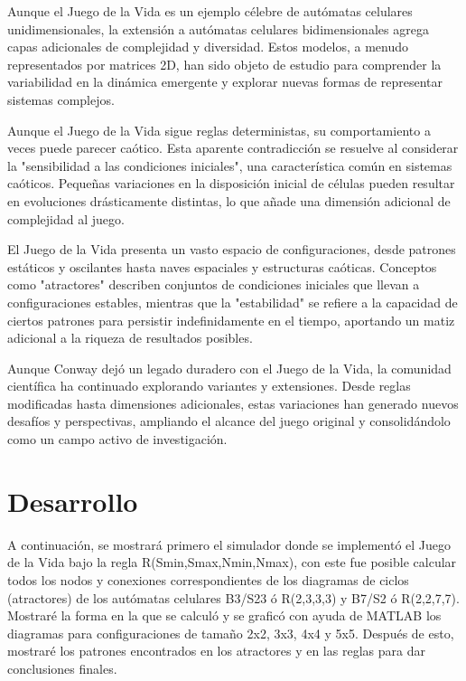 \documentclass{article}
\begin{document}
	Aunque el Juego de la Vida es un ejemplo célebre de autómatas celulares unidimensionales, la extensión a autómatas celulares bidimensionales agrega capas adicionales de complejidad y diversidad. Estos modelos, a menudo representados por matrices 2D, han sido objeto de estudio para comprender la variabilidad en la dinámica emergente y explorar nuevas formas de representar sistemas complejos.
	
	Aunque el Juego de la Vida sigue reglas deterministas, su comportamiento a veces puede parecer caótico. Esta aparente contradicción se resuelve al considerar la "sensibilidad a las condiciones iniciales", una característica común en sistemas caóticos. Pequeñas variaciones en la disposición inicial de células pueden resultar en evoluciones drásticamente distintas, lo que añade una dimensión adicional de complejidad al juego.
	
	El Juego de la Vida presenta un vasto espacio de configuraciones, desde patrones estáticos y oscilantes hasta naves espaciales y estructuras caóticas. Conceptos como "atractores" describen conjuntos de condiciones iniciales que llevan a configuraciones estables, mientras que la "estabilidad" se refiere a la capacidad de ciertos patrones para persistir indefinidamente en el tiempo, aportando un matiz adicional a la riqueza de resultados posibles.
	
	Aunque Conway dejó un legado duradero con el Juego de la Vida, la comunidad científica ha continuado explorando variantes y extensiones. Desde reglas modificadas hasta dimensiones adicionales, estas variaciones han generado nuevos desafíos y perspectivas, ampliando el alcance del juego original y consolidándolo como un campo activo de investigación.


	\renewcommand{\cftsecfont}{\bfseries}
	\renewcommand{\cftsubsecfont}{\normalfont}
	\renewcommand{\cftsecleader}{\cftdotfill{\cftdotsep}}
	\renewcommand{\cftsubsecleader}{\cftdotfill{\cftdotsep}}
	
	\section{Desarrollo}
	
	A continuación, se mostrará primero el simulador donde se implementó el Juego de la Vida bajo la regla R(Smin,Smax,Nmin,Nmax), con este fue posible calcular todos los nodos y conexiones correspondientes de los diagramas de ciclos (atractores) de los autómatas celulares B3/S23 ó R(2,3,3,3) y B7/S2 ó R(2,2,7,7).
	Mostraré la forma en la que se calculó y se graficó con ayuda de MATLAB los diagramas para configuraciones de tamaño 2x2, 3x3, 4x4 y 5x5. 
	Después de esto, mostraré los patrones encontrados en los atractores y en las reglas para dar conclusiones finales. 
	
\end{document}
